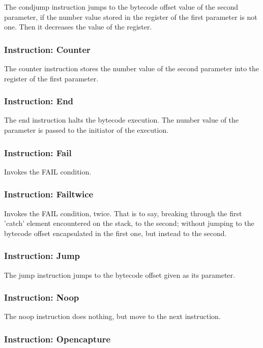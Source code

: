 The condjump instruction jumps to the bytecode offset value
of the second parameter, if the number value stored in the register
of the first parameter is not one. Then it decreases the value of the
register.

\subsubsection{Instruction: Counter}

The counter instruction stores the number value of the second parameter
into the register of the first parameter.

\subsubsection{Instruction: End}

The end instruction halts the bytecode execution. The number value
of the parameter is passed to the initiator of the execution.

\subsubsection{Instruction: Fail}

Invokes the FAIL condition.

\subsubsection{Instruction: Failtwice}

Invokes the FAIL condition, twice. That is to say, breaking through
the first 'catch' element encountered on the stack, to the second;
without jumping to the bytecode offset encapsulated in the first one,
but instead to the second.

\subsubsection{Instruction: Jump}

The jump instruction jumps to the bytecode offset given as its parameter.

\subsubsection{Instruction: Noop}

The noop instruction does nothing, but move to the next instruction.

\subsubsection{Instruction: Opencapture}

